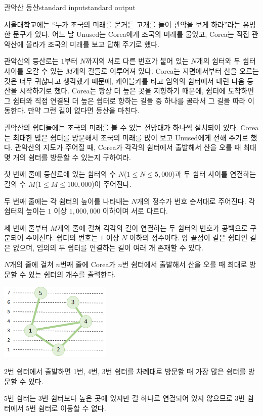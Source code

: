 \begin{problem}{관악산 등산}{standard input}{standard output}

서울대학교에는 ``누가 조국의 미래를 묻거든 고개를 들어 관악을 보게 하라''라는 유명한 문구가 있다. 어느 날 Unused는 Corea에게 조국의 미래를 물었고, Corea는 직접 관악산에 올라가 조국의 미래를 보고 답해 주기로 했다.

관악산의 등산로는 $1$부터 $N$까지의 서로 다른 번호가 붙어 있는 $N$개의 쉼터와 두 쉼터 사이를 오갈 수 있는 $M$개의 길들로 이루어져 있다. Corea는 지면에서부터 산을 오르는 것은 너무 귀찮다고 생각했기 때문에, 케이블카를 타고 임의의 쉼터에서 내린 다음 등산을 시작하기로 했다. Corea는 항상 더 높은 곳을 지향하기 때문에, 쉼터에 도착하면 그 쉼터와 직접 연결된 더 높은 쉼터로 향하는 길들 중 하나를 골라서 그 길을 따라 이동한다. 만약 그런 길이 없다면 등산을 마친다.

관악산의 쉼터들에는 조국의 미래를 볼 수 있는 전망대가 하나씩 설치되어 있다. Corea는 최대한 많은 쉼터를 방문해서 조국의 미래를 많이 보고 Unused에게 전해 주기로 했다. 관악산의 지도가 주어질 때, Corea가 각각의 쉼터에서 출발해서 산을 오를 때 최대 몇 개의 쉼터를 방문할 수 있는지 구하여라.

\InputFile
첫 번째 줄에 등산로에 있는 쉼터의 수 $N$($1 \le N \le 5,000$)과 두 쉼터 사이를 연결하는 길의 수 $M$($1 \le M \le 100,000$)이 주어진다.

두 번째 줄에는 각 쉼터의 높이를 나타내는 $N$개의 정수가 번호 순서대로 주어진다. 각 쉼터의 높이는 $1$ 이상 $1,000,000$ 이하이며 서로 다르다.

세 번째 줄부터 $M$개의 줄에 걸쳐 각각의 길이 연결하는 두 쉼터의 번호가 공백으로 구분되어 주어진다. 쉼터의 번호는 $1$ 이상 $N$ 이하의 정수이다. 양 끝점이 같은 쉼터인 길은 없으며, 임의의 두 쉼터를 연결하는 길이 여러 개 존재할 수 있다.

\OutputFile

$N$개의 줄에 걸쳐 $n$번째 줄에 Corea가 $n$번 쉼터에서 출발해서 산을 오를 때 최대로 방문할 수 있는 쉼터의 개수를 출력한다.

\Example

\begin{example}
%
\end{example}

\Notes
\begin{center}
  \includegraphics[width=0.4\textwidth]{climb.png}
\end{center}

2번 쉼터에서 출발하면 1번, 4번, 3번 쉼터를 차례대로 방문할 때 가장 많은 쉼터를 방문할 수 있다.

5번 쉼터는 3번 쉼터보다 높은 곳에 있지만 길 하나로 연결되어 있지 않으므로 3번 쉼터에서 5번 쉼터로 이동할 수 없다.

\end{problem}
